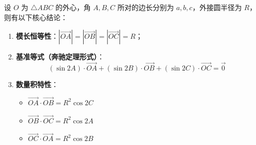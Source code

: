 \begin{statementbox}
设 $O$ 为 $\triangle ABC$ 的外心，角 $A, B, C$ 所对的边长分别为 $a, b, c$，外接圆半径为 $R$，则有以下核心结论：
\begin{enumerate}
    \item \textbf{模长恒等性}：$|\vec{OA}| = |\vec{OB}| = |\vec{OC}| = R$；
    \item \textbf{基准等式（奔驰定理形式）}：
    \[ (\sin 2A) \cdot \vec{OA} + (\sin 2B) \cdot \vec{OB} + (\sin 2C) \cdot \vec{OC} = \vec{0} \]
    \item \textbf{数量积特性}：
    \begin{itemize}
        \item $\vec{OA} \cdot \vec{OB} = R^2 \cos 2C$
        \item $\vec{OB} \cdot \vec{OC} = R^2 \cos 2A$
        \item $\vec{OC} \cdot \vec{OA} = R^2 \cos 2B$
    \end{itemize}
\end{enumerate}
\end{statementbox}